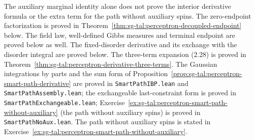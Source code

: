 \begin{remark}\label{rem:sg-tal:perceptron-smart-path-remaining}
The auxiliary marginal identity alone does not prove the interior derivative formula or the extra term
for the path without auxiliary spins. The zero-endpoint factorization is proved in
Theorem~\ref{thm:sg-tal:perceptron-decoupled-endpoint} below. The field law, well-defined
Gibbs measures and terminal endpoint are proved below as well. The fixed-disorder derivative and its exchange with the disorder integral are proved below.
The three-term expansion (2.28) is proved in Theorem~\ref{thm:sg-tal:perceptron-derivative-three-terms}.
The Gaussian integrations by parts and the sum form of Proposition~\ref{prop:sg-tal:perceptron-smart-path-derivative} are proved in \texttt{SmartPathIBP.lean} and \texttt{SmartPathAssembly.lean}; the exchangeable last-constraint form is proved in \texttt{SmartPathExchangeable.lean}; Exercise~\ref{ex:sg-tal:perceptron-smart-path-without-auxiliary} (the path without auxiliary spins) is proved in \texttt{SmartPathNoAux.lean}.
The path without auxiliary spins is stated in Exercise~\ref{ex:sg-tal:perceptron-smart-path-without-auxiliary}.
\end{remark}


